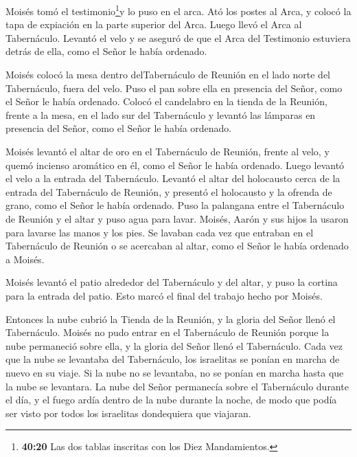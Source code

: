  Moisés tomó el testimonio\footnote{\textbf{40:20} Las dos
  tablas inscritas con los Diez Mandamientos.}y lo puso en el arca. Ató
los postes al Arca, y colocó la tapa de expiación en la parte superior
del Arca.  Luego llevó el Arca al Tabernáculo. Levantó el
velo y se aseguró de que el Arca del Testimonio estuviera detrás de
ella, como el Señor le había ordenado.

 Moisés colocó la mesa dentro delTabernáculo de Reunión en
el lado norte del Tabernáculo, fuera del velo.  Puso el pan
sobre ella en presencia del Señor, como el Señor le había ordenado.
 Colocó el candelabro en la tienda de la Reunión, frente a
la mesa, en el lado sur del Tabernáculo  y levantó las
lámparas en presencia del Señor, como el Señor le había ordenado.

 Moisés levantó el altar de oro en el Tabernáculo de
Reunión, frente al velo,  y quemó incienso aromático en él,
como el Señor le había ordenado.  Luego levantó el velo a
la entrada del Tabernáculo.  Levantó el altar del
holocausto cerca de la entrada del Tabernáculo de Reunión, y presentó el
holocausto y la ofrenda de grano, como el Señor le había ordenado.
 Puso la palangana entre el Tabernáculo de Reunión y el
altar y puso agua para lavar.  Moisés, Aarón y sus hijos la
usaron para lavarse las manos y los pies.  Se lavaban cada
vez que entraban en el Tabernáculo de Reunión o se acercaban al altar,
como el Señor le había ordenado a Moisés.

 Moisés levantó el patio alrededor del Tabernáculo y del
altar, y puso la cortina para la entrada del patio. Esto marcó el final
del trabajo hecho por Moisés.

 Entonces la nube cubrió la Tienda de la Reunión, y la
gloria del Señor llenó el Tabernáculo.  Moisés no pudo
entrar en el Tabernáculo de Reunión porque la nube permaneció sobre
ella, y la gloria del Señor llenó el Tabernáculo.  Cada vez
que la nube se levantaba del Tabernáculo, los israelitas se ponían en
marcha de nuevo en su viaje.  Si la nube no se levantaba,
no se ponían en marcha hasta que la nube se levantara.  La
nube del Señor permanecía sobre el Tabernáculo durante el día, y el
fuego ardía dentro de la nube durante la noche, de modo que podía ser
visto por todos los israelitas dondequiera que viajaran.
